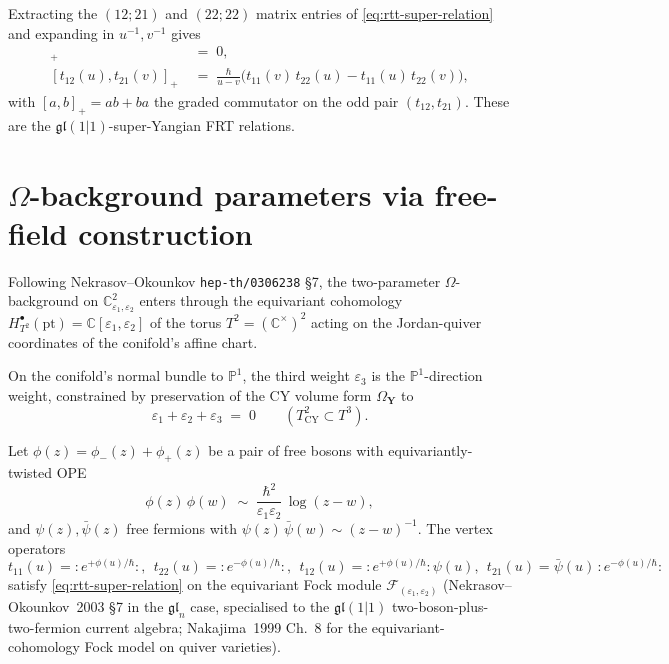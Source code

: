 \documentclass[11pt]{amsart}
\theoremstyle{definition}
\providecommand{\bC}{\mathbb{C}}
\providecommand{\bP}{\mathbb{P}}
\providecommand{\cF}{\mathcal{F}}
\providecommand{\fgl}{\mathfrak{gl}}
\providecommand{\bY}{\mathbf{Y}}
\begin{document}
Extracting the $(12; 21)$ and $(22; 22)$ matrix entries of
\eqref{eq:rtt-super-relation} and expanding in $u^{-1}, v^{-1}$ gives
\begin{align*}
  [t_{12}(u), t_{12}(v)]_+ &\;=\; 0, \\
  [t_{12}(u), t_{21}(v)]_+
  &\;=\; \frac{\hbar}{u - v}\bigl(t_{11}(v)\, t_{22}(u) - t_{11}(u)\, t_{22}(v)\bigr),
\end{align*}
with $[a, b]_+ = a b + b a$ the graded commutator on the odd pair
$(t_{12}, t_{21})$. These are the $\fgl(1|1)$-super-Yangian FRT
relations.

\section{$\Omega$-background parameters via free-field construction}
\label{sec:omega-free-field}

Following Nekrasov--Okounkov \texttt{hep-th/0306238} \S7, the
two-parameter $\Omega$-background on
$\bC^2_{\varepsilon_1, \varepsilon_2}$ enters through the equivariant
cohomology $H^\bullet_{T^2}(\mathrm{pt}) = \bC[\varepsilon_1,
\varepsilon_2]$ of the torus $T^2 = (\bC^\times)^2$ acting on the
Jordan-quiver coordinates of the conifold's affine chart.

On the conifold's normal bundle to $\bP^1$, the third weight
$\varepsilon_3$ is the $\bP^1$-direction weight, constrained by
preservation of the CY volume form $\Omega_\bY$ to
\begin{equation}\label{eq:conifold-cy-constraint}
  \varepsilon_1 + \varepsilon_2 + \varepsilon_3 \;=\; 0
  \qquad (T^2_{\mathrm{CY}} \subset T^3).
\end{equation}

Let $\phi(z) = \phi_-(z) + \phi_+(z)$ be a pair of free bosons with
equivariantly-twisted OPE
\[
  \phi(z)\, \phi(w)
  \;\sim\;
  \frac{\hbar^2}{\varepsilon_1 \varepsilon_2}\, \log(z - w),
\]
and $\psi(z), \bar\psi(z)$ free fermions with
$\psi(z)\, \bar\psi(w) \sim (z - w)^{-1}$. The vertex operators
\begin{equation}\label{eq:rtt-free-field-vertices}
  t_{11}(u) = :\!e^{+\phi(u)/\hbar}\!:,
  \ \
  t_{22}(u) = :\!e^{-\phi(u)/\hbar}\!:,
  \ \
  t_{12}(u) = :\!e^{+\phi(u)/\hbar}\!:\!\psi(u),
  \ \
  t_{21}(u) = \bar\psi(u)\,:\!e^{-\phi(u)/\hbar}\!:
\end{equation}
satisfy \eqref{eq:rtt-super-relation} on the equivariant Fock module
$\cF_{(\varepsilon_1, \varepsilon_2)}$ (Nekrasov--Okounkov~2003 \S7 in
the $\fgl_n$ case, specialised to the $\fgl(1|1)$
two-boson-plus-two-fermion current algebra; Nakajima~1999 Ch.~8 for the
equivariant-cohomology Fock model on quiver varieties).
\end{document}
